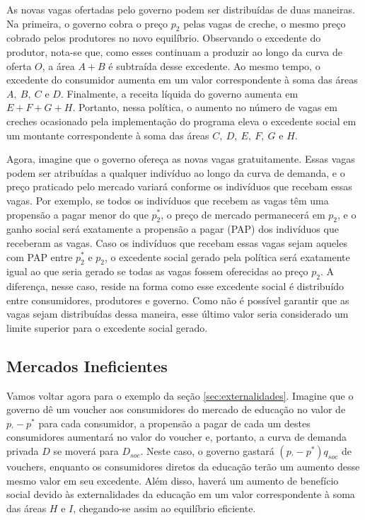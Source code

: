 \documentclass[12pt,letterpaper]{article}
\newcommand{\1}{\mathbbm{1}}
\numberwithin{equation}{section}
\begin{document}
As novas vagas ofertadas pelo governo podem ser distribuídas de duas maneiras. Na primeira, o governo cobra o preço $p_{2}$ pelas vagas de creche, o mesmo preço cobrado pelos produtores no novo equilíbrio. Observando o excedente do produtor, nota-se que, como esses continuam a produzir ao longo da curva de oferta $O$, a área $A + B$ é subtraída desse excedente. Ao mesmo tempo, o excedente do consumidor aumenta em um valor correspondente à soma das áreas $A,\ B,\ C$ e $D$. Finalmente, a receita líquida do governo aumenta em $E + F + G + H$. Portanto, nessa política, o aumento no número de vagas em creches ocasionado pela implementação do programa eleva o excedente social em um montante correspondente à soma das áreas $C,\ D,\ E,\ F,\ G$ e $H$.

Agora, imagine que o governo ofereça as novas vagas gratuitamente. Essas vagas podem ser atribuídas a qualquer indivíduo ao longo da curva de demanda, e o preço praticado pelo mercado variará conforme os indivíduos que recebam essas vagas. Por exemplo, se todos os indivíduos que recebem as vagas têm uma propensão a pagar menor do que $p_{2}^{*}$, o preço de mercado permanecerá em $p_{2}$, e o ganho social será exatamente a propensão a pagar (PAP) dos indivíduos que receberam as vagas. Caso os indivíduos que recebam essas vagas sejam aqueles com PAP entre $p_{2}^{*}$ e $p_{2}$, o excedente social gerado pela política será exatamente igual ao que seria gerado se todas as vagas fossem oferecidas ao preço $p_{2}$. A diferença, nesse caso, reside na forma como esse excedente social é distribuído entre consumidores, produtores e governo. Como não é possível garantir que as vagas sejam distribuídas dessa maneira, esse último valor seria considerado um limite superior para o excedente social gerado.

\subsection{Mercados Ineficientes}

Vamos voltar agora para o exemplo da seção \ref{sec:externalidades}. Imagine que o governo dê um voucher aos consumidores do mercado de educação no valor de $p_{'}-p^{*}$ para cada consumidor, a propensão a pagar de cada um destes consumidores aumentará no valor do voucher e, portanto, a curva de demanda privada $D$ se moverá para $D_{soc}$. Neste caso, o governo gastará $(p_{'}-p^{*})q_{soc}$ de vouchers, enquanto os consumidores diretos da educação terão um aumento desse mesmo valor em seu excedente. Além disso, haverá um aumento de benefício social devido às externalidades da educação em um valor correspondente à soma das áreas $H$ e $I$, chegando-se assim ao equilíbrio eficiente.
\end{document}
